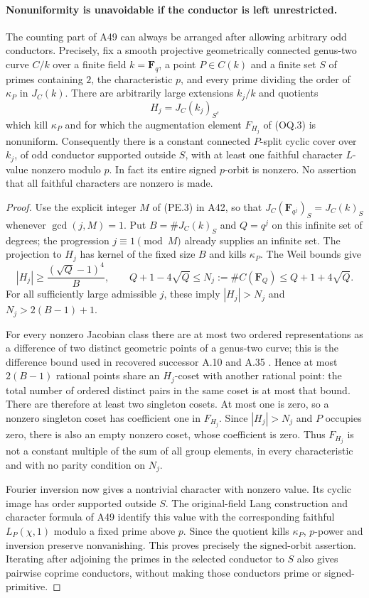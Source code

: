 \paragraph{Nonuniformity is unavoidable if the conductor is left unrestricted.}
The counting part of A49 can always be arranged after allowing
arbitrary odd conductors. Precisely, fix a smooth projective
geometrically connected genus-two curve $C/k$ over a finite field
$k=\mathbf F_q$, a point $P\in C(k)$ and a finite set $S$ of primes containing
$2$, the characteristic $p$, and every prime dividing the order
of $\kappa_P$ in $J_C(k)$.
There are arbitrarily large extensions $k_j/k$ and quotients
\[
 H_j=J_C(k_j)_{S^c}
\]
which kill $\kappa_P$ and for which the augmentation element
$F_{H_j}$ of (OQ.3) is nonuniform.
Consequently there is a constant connected $P$-split cyclic cover
over $k_j$, of odd conductor supported outside $S$, with at least
one faithful character $L$-value nonzero modulo $p$.
In fact its entire signed $p$-orbit is nonzero. No assertion that
all faithful characters are nonzero is made.

\begin{proof}
Use the explicit integer $M$ of (PE.3) in A42, so that
$J_C(\mathbf F_{q^j})_S=J_C(k)_S$ whenever $\gcd(j,M)=1$.
Put $B=\#J_C(k)_S$ and $Q=q^j$ on this infinite set of degrees;
the progression $j\equiv1\pmod M$ already supplies an infinite set.
The projection to $H_j$ has kernel of the fixed size $B$ and
kills $\kappa_P$. The Weil bounds \cite[Theorem~19.1]{MilneAV} give
\[
 |H_j|\ge\frac{(\sqrt Q-1)^4}{B},\qquad
 Q+1-4\sqrt Q\le N_j:=\#C(\mathbf F_Q)
                         \le Q+1+4\sqrt Q.
\]
For all sufficiently large admissible $j$, these imply
$|H_j|>N_j$ and $N_j>2(B-1)+1$.

For every nonzero Jacobian class there are at most two ordered
representations as a difference of two distinct geometric points
of a genus-two curve; this is the difference bound used in recovered
successor A.10 and A.35 \cite[A.10, A.35]{ASrun}.
Hence at most $2(B-1)$ rational points
share an $H_j$-coset with another rational point: the total number
of ordered distinct pairs in the same coset is at most that bound.
There are therefore at least two singleton cosets. At most one
is zero, so a nonzero singleton coset has coefficient one in
$F_{H_j}$. Since $|H_j|>N_j$ and $P$ occupies zero, there is
also an empty nonzero coset, whose coefficient is zero.
Thus $F_{H_j}$ is not a constant multiple of the sum of all
group elements, in every characteristic and with no parity
condition on $N_j$.

Fourier inversion now gives a nontrivial character with nonzero
value. Its cyclic image has order supported outside $S$.
The original-field Lang construction and character formula of
A49 identify this value with the corresponding faithful
$L_P(\chi,1)$ modulo a fixed prime above $p$.
Since the quotient kills $\kappa_P$, $p$-power and inversion
preserve nonvanishing. This proves precisely the signed-orbit
assertion. Iterating after adjoining the primes in the selected
conductor to $S$ also gives pairwise coprime conductors, without
making those conductors prime or signed-primitive.
\end{proof}


